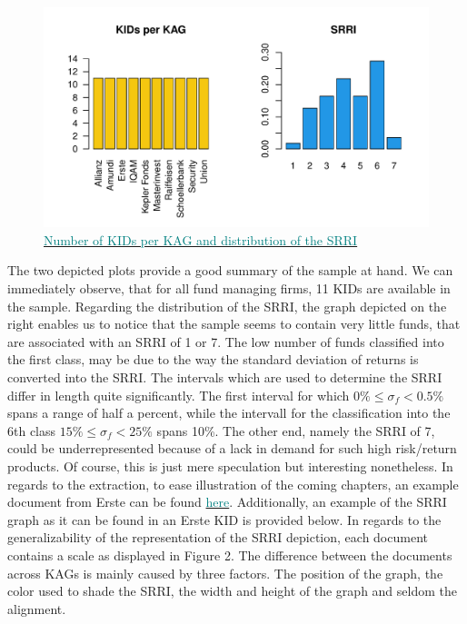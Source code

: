 \documentclass[aodsor,preprint]{imsart}
\numberwithin{equation}{section}
\theoremstyle{plain}
\begin{document}
\begin{figure}[H]
	\includegraphics[width = 12cm]{data_overview.pdf}
	\caption{\href{https://github.com/Base-R-Best-R/KID/blob/main/Code/Tests/Test_ext_Function.pdf}{\textcolor{teal}{Number of KIDs per KAG and distribution of the SRRI}}}
\end{figure}

The two depicted plots provide a good summary of the sample at hand. We can immediately observe, that for all fund managing firms, 11 KIDs are available in the sample. Regarding the distribution of the SRRI, the graph depicted on the right enables us to notice that the sample seems to contain very little funds, that are associated with an SRRI of 1 or 7. The low number of funds classified into the first class, may be due to the way the standard deviation of returns is converted into the SRRI. The intervals which are used to determine the SRRI differ in length quite significantly. The first interval for which $0\% \leq\sigma_f<0.5\%$ spans a range of half a percent, while the intervall for the classification into the 6th class $15\%\leq\sigma_f<25\%$ spans 10\%. The other end, namely the SRRI of 7, could be underrepresented because of a lack in demand for such high risk/return products. Of course, this is just mere speculation but interesting nonetheless.
In regards to the extraction, to ease illustration of the coming chapters, an example document from Erste can be found \href{https://github.com/Base-R-Best-R/KID/blob/main/KIDs/Erste/kid-eb-147-t2957-at_de-de_en_4.pdf}{\textcolor{teal}{here}}. Additionally, an example of the SRRI graph as it can be found in an Erste KID is provided below. In regards to the generalizability of the representation of the SRRI depiction, each document contains a scale as displayed in Figure 2. The difference between the documents across KAGs is mainly caused by three factors. The position of the graph, the color used to shade the SRRI, the width and height of the graph and seldom the alignment. 
\end{document}
